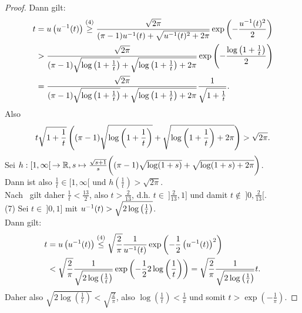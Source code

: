 \begin{proof}
Dann gilt:
\begin{align*}
t & = u\left(u^{-1}(t)\right) \overset{(4)}\ge
\frac{\sqrt{2\pi}}{(\pi-1)u^{-1}(t) 
+ \sqrt{u^{-1}(t)^2+2\pi}}\exp\left(-\frac{u^{-1}(t)^2}2\right)\\
& >  \frac{\sqrt{2\pi}}{(\pi-1) \sqrt{\log\left(1 +\frac 1 t\right)}
+ \sqrt{\log\left(1 +\frac 1 t\right)+2\pi}}
\exp\left(-\frac{\log\left(1 +\frac 1 t\right)}2\right)\\
& = \frac{\sqrt{2\pi}}{(\pi-1) \sqrt{\log\left(1 +\frac 1 t\right)}
+ \sqrt{\log\left(1 +\frac 1 t\right)+2\pi}}
\frac 1 {\sqrt{1+\frac 1 t}}\text.
\end{align*}
Also
\[t\sqrt{1+\frac 1 t} \left((\pi-1) \sqrt{\log\left(1 +\frac 1 t\right)}
+ \sqrt{\log\left(1 +\frac 1 t\right)+2\pi}\right)  > \sqrt{2\pi}\text.\]
Sei $h: [1, \infty[\!\  \rightarrow \mathbb{R}, s \mapsto
\frac{\sqrt{s+1}}s
\bigg( (\pi-1)\sqrt{\log(1+s)} + \sqrt{\log(1+s) + 2\pi} \bigg)$.\\
Dann ist also $\frac 1 t \in [1, \infty[$ und 
$h\left(\frac 1 t \right) > \sqrt{2\pi}$.\\
Nach~ gilt daher $\frac 1 t <\frac{13}2$,
also $t > \frac 2 {13}$, d.h. $t \in\!\  ]\frac 2 {13}, 1]$ und damit
$t \notin \!\ ]0, \frac 2 {13}[$.\\
(7) Sei $t\in\!\  ]0,1]$ mit $u^{-1}(t) > \sqrt{2\log\left(\frac 1 t\right)}$.\\
Dann gilt:
\begin{align*}
t &= u\left(u^{-1}(t)\right) \overset{(4)}\le 
\sqrt{\frac 2 \pi} \frac 1 {u^{-1}(t)}
\exp\left(- \frac 1 2 \left(u^{-1}(t) \right)^2 \right)\\
&< \sqrt{\frac 2 \pi} \frac 1 {\sqrt{2\log\left(\frac 1 t\right)}}
\exp\left(- \frac 1 2 2\log\left(\frac 1 t\right) \right)
= \sqrt{\frac 2 \pi} \frac 1 {\sqrt{2\log\left(\frac 1 t\right)}} t\text.
\end{align*}
Daher also
$\sqrt{2\log\left(\frac 1 t \right)} < \sqrt {\frac 2 \pi}$, also 
 $\log\left(\frac 1 t \right) < \frac 1 \pi$
und somit $t > \exp\left(- \frac 1 \pi \right)$.
\end{proof}